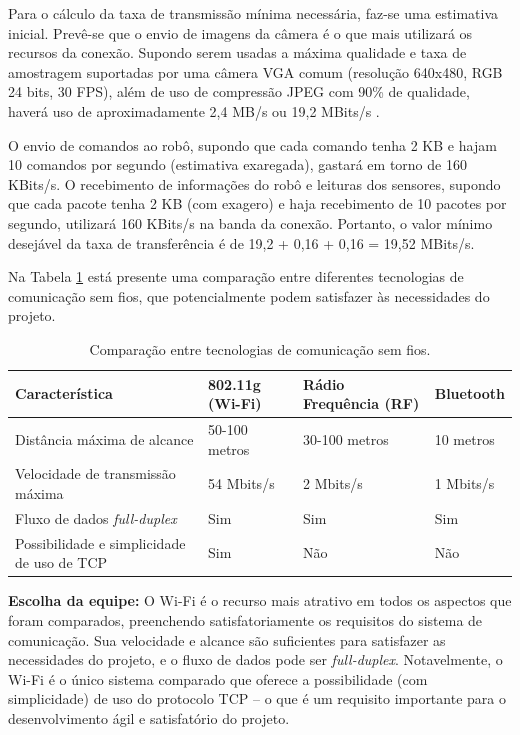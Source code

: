 Para o cálculo da taxa de transmissão mínima necessária, faz-se uma estimativa inicial. Prevê-se que o envio de imagens da câmera é o que mais utilizará os recursos da conexão. Supondo serem usadas a máxima qualidade e taxa de amostragem suportadas por uma câmera VGA comum (resolução 640x480, RGB 24 bits, 30 FPS), além de uso de compressão JPEG com 90\% de qualidade, haverá uso de aproximadamente 2,4 MB/s ou 19,2 MBits/s \cite{webcam_resolution}. 

O envio de comandos ao robô, supondo que cada comando tenha 2 KB e hajam 10 comandos por segundo (estimativa exaregada), gastará em torno de 160 KBits/s. O recebimento de informações do robô e leituras dos sensores, supondo que cada pacote tenha 2 KB (com exagero) e haja recebimento de 10 pacotes por segundo, utilizará 160 KBits/s na banda da conexão. Portanto, o valor mínimo desejável da taxa de transferência é de 19,2 + 0,16 + 0,16 = 19,52 MBits/s.

Na Tabela \ref{tab:alternativas_comunicacao} está presente uma comparação entre diferentes tecnologias de comunicação sem fios, que potencialmente podem satisfazer às necessidades do projeto. 


\begin{table}[h]
  \caption{Comparação entre tecnologias de comunicação sem fios.}
  \centering
  \begin{tabular}{p{4.5cm}|p{3cm}p{4cm}p{2cm}}
    \toprule
    \textbf{Característica} & \textbf{802.11g (Wi-Fi)} & \multicolumn{1}{l}{\textbf{Rádio Frequência (RF)}} & \textbf{Bluetooth}  \\
    \hline
    Distância máxima de alcance & 50-100 metros  & 30-100 metros & 10 metros \\
    \hline
    Velocidade de transmissão máxima & 54 Mbits/s & 2 Mbits/s & 1 Mbits/s \\
    \hline
    Fluxo de dados \textit{full-duplex} & Sim & Sim & Sim \\
    \hline
    Possibilidade e simplicidade de uso de TCP & Sim & Não & Não \\
    \bottomrule
  \end{tabular}
  \label{tab:alternativas_comunicacao}
\end{table}

\textbf{Escolha da equipe:} O Wi-Fi é o recurso mais atrativo em todos os aspectos que foram comparados, preenchendo satisfatoriamente os requisitos do sistema de comunicação. Sua velocidade e alcance são suficientes para satisfazer as necessidades do projeto, e o fluxo de dados pode ser \textit{full-duplex}. Notavelmente, o Wi-Fi é o único sistema comparado que oferece a possibilidade (com simplicidade) de uso do protocolo TCP -- o que é um requisito importante para o desenvolvimento ágil e satisfatório do projeto.

